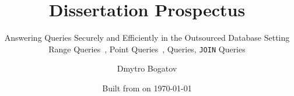 \title{Dissertation Prospectus}

\subtitle{
	Answering Queries Securely and Efficiently in the Outsourced Database Setting \\
	{\small Range Queries~\cite{ore-benchmark-17, epsolute}, Point Queries~\cite{epsolute}, \knn{} Queries, \texttt{JOIN} Queries}
}

\date{Built from \href{https://git.dbogatov.org/bu/proposal/presentation/commit/\version}{\emph{\version}} on \today}

\author{Dmytro Bogatov \\ }


\def\wm{\begin{tabular}{c} Dmytro Bogatov \\ Boston University \end{tabular}}
